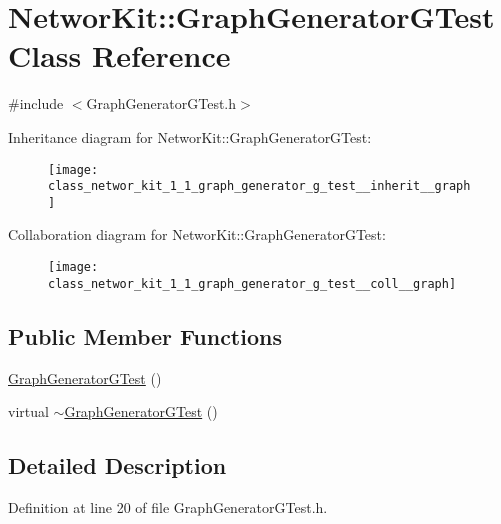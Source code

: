 \hypertarget{class_networ_kit_1_1_graph_generator_g_test}{\section{Networ\-Kit\-:\-:Graph\-Generator\-G\-Test Class Reference}
\label{class_networ_kit_1_1_graph_generator_g_test}
}


{\ttfamily \#include $<$Graph\-Generator\-G\-Test.\-h$>$}



Inheritance diagram for Networ\-Kit\-:\-:Graph\-Generator\-G\-Test\-:\nopagebreak
\begin{figure}[H]
\begin{center}
\leavevmode
\texttt{[image: class\_networ\_kit\_1\_1\_graph\_generator\_g\_test\_\_inherit\_\_graph]}
\end{center}
\end{figure}


Collaboration diagram for Networ\-Kit\-:\-:Graph\-Generator\-G\-Test\-:\nopagebreak
\begin{figure}[H]
\begin{center}
\leavevmode
\texttt{[image: class\_networ\_kit\_1\_1\_graph\_generator\_g\_test\_\_coll\_\_graph]}
\end{center}
\end{figure}
\subsection*{Public Member Functions}
\begin{DoxyCompactItemize}
\item 
\hyperlink{class_networ_kit_1_1_graph_generator_g_test_acc9fefcf1a0de63c37f16602571b72cd}{Graph\-Generator\-G\-Test} ()
\item 
virtual \hyperlink{class_networ_kit_1_1_graph_generator_g_test_a12fad3c3dcc56002e358232d6b5dbb17}{$\sim$\-Graph\-Generator\-G\-Test} ()
\end{DoxyCompactItemize}


\subsection{Detailed Description}


Definition at line 20 of file Graph\-Generator\-G\-Test.\-h.



